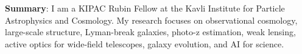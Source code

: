 

\textbf{Summary}:
I am a KIPAC Rubin Fellow at the Kavli Institute for Particle Astrophysics and Cosmology.
My research focuses on observational cosmology, large-scale structure, Lyman-break galaxies, photo-z estimation, weak lensing, active optics for wide-field telescopes, galaxy evolution, and AI for science.